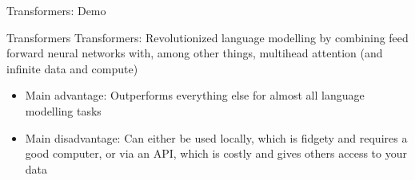\documentclass[10pt]{beamer}
\begin{document}
    \begin{frame}{Transformers: Demo}
        \centering
    \end{frame}

    \begin{frame}{Transformers}
        Transformers: Revolutionized language modelling by combining feed forward neural networks with, among other things, multihead attention (and infinite data and compute)
            \begin{itemize}
                \item Main advantage: Outperforms everything else for almost all language modelling tasks
                \item Main disadvantage: Can either be used locally, which is fidgety and requires a good computer, or via an API, which is costly and gives others access to your data
            \end{itemize}
    \end{frame}
\end{document}
